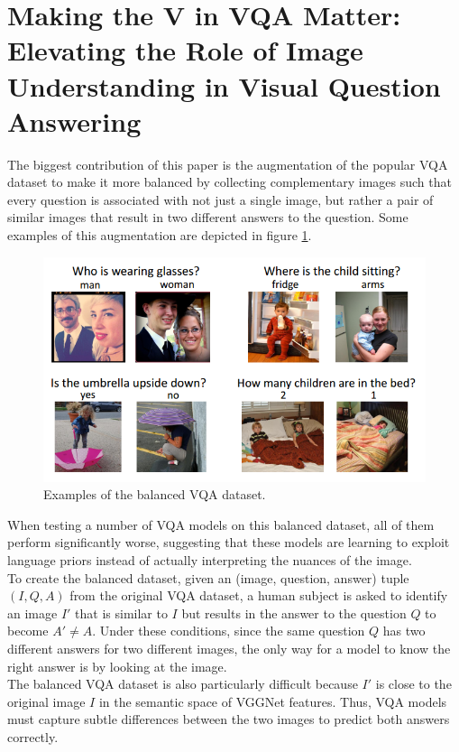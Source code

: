 \documentclass{article}
\begin{document}
\section{Making the V in VQA Matter: Elevating the Role of Image Understanding in Visual Question Answering}\label{newSec}
The biggest contribution of this paper \citep{cvprGoyal17} is the augmentation of the popular VQA dataset to make it more balanced by collecting complementary images such that every question is associated with not just a single image, but rather a pair of similar images that result in two different answers to the question. Some examples of this augmentation are depicted in figure \ref{balancedExample}.

    \begin{figure}[ht]
    	\centering
            \includegraphics[width=0.75\linewidth]{balancedExample.PNG}
        \caption{Examples of the balanced VQA dataset.}
    	\label{balancedExample}
    \end{figure}

When testing a number of VQA models on this balanced dataset, all of them perform significantly worse, suggesting that these models are learning to exploit language priors instead of actually interpreting the nuances of the image.\\
To create the balanced dataset, given an (image, question, answer) tuple $(I,Q,A)$ from the original VQA dataset, a human subject is asked to identify an image $I'$ that is similar to $I$ but results in the answer to the question $Q$ to become $A' \neq A$. Under these conditions, since the same question $Q$ has two different answers for two different images, the only way for a model to know the right answer is by looking at the image.\\
The balanced VQA dataset is also particularly difficult because $I'$ is close to the original image $I$ in the semantic space of VGGNet features. Thus, VQA models must capture subtle differences between the two images to predict both answers correctly.
\end{document}
